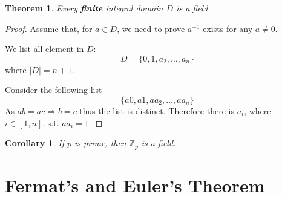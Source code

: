 \documentclass{article}
\theoremstyle{MyNonumberplain}
\theoremstyle{break}
\newtheorem*{proof}{Proof. }
\theoremstyle{break}
\newtheorem{theorem}{Theorem}[section]
\newtheorem{corollary}{Corollary}[theorem]
\theoremstyle{break}
\theoremstyle{definition}
\theoremstyle{break}
\begin{document}
\begin{thmbox}
    \begin{theorem}
        Every \textbf{finite} integral domain $D$ is a field. 
    \end{theorem}
    \begin{prfbox}
        \begin{proof}
            Assume that, for $a \in D$, we need to prove $a^{- 1}$ exists for any $a \neq
            0$.\bigskip
            
            We list all element in $D :$
            \[ D = \{ 0, 1, a_2, \ldots, a_n \} \]
            where $| D | = n + 1$.\bigskip
            
            Consider the following list
            \[ \{ a 0, a 1, a a_2, \ldots, a a_n \} \]
            As $a b = a c \Rightarrow b = c$ thus the list is distinct. Therefore there is
            $a_i$, where $i \in [1, n]$, s.t. $a a_i = 1$.
        \end{proof}
    \end{prfbox}
\end{thmbox}

\begin{thmbox}
    \begin{corollary}
        If $p$ is prime, then $\mathbb{Z}_p$ is a field.
    \end{corollary}
\end{thmbox}

\newpage

\section{Fermat's and Euler's Theorem}
\end{document}
